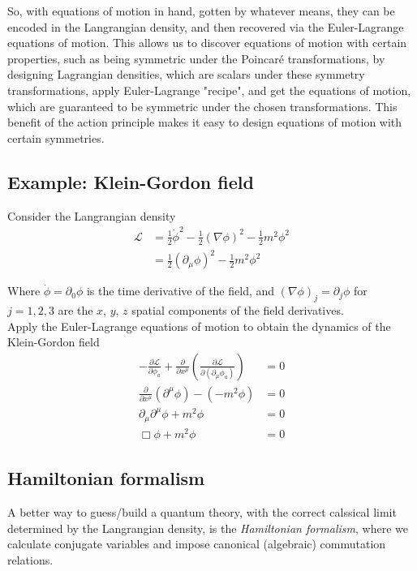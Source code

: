\noindent So, with equations of motion in hand, gotten by whatever means, they can be encoded in the Langrangian density, and then recovered via the Euler-Lagrange equations of motion. This allows us to discover equations of motion with certain properties, such as being symmetric under the Poincar\'e transformations, by designing Lagrangian densities, which are scalars under these symmetry transformations, apply Euler-Lagrange "recipe", and get the equations of motion, which are guaranteed to be symmetric under the chosen transformations. This benefit of the action principle makes it easy to design equations of motion with certain symmetries. \\

\subsection*{Example: Klein-Gordon field}

Consider the Langrangian density 
\begin{align}
\mathscr{L} &= \frac{1}{2}\dot{\phi}^2 - \frac{1}{2}(\nabla\phi)^2 - \frac{1}{2}m^2\phi^2 \\
&= \frac{1}{2}(\partial_\mu \phi)^2 - \frac{1}{2}m^2\phi^2
\end{align}

\noindent Where $\dot{\phi} = \partial_0 \phi$ is the time derivative of the field, and $(\nabla\phi)_j = \partial_j\phi$ for $j=1, 2, 3$ are the $x$, $y$, $z$ spatial components of the field derivatives. \\

\noindent Apply the Euler-Lagrange equations of motion to obtain the dynamics of the Klein-Gordon field
\begin{align}
-\frac{\partial \mathscr{L}}{\partial \phi_a} + \frac{\partial}{\partial x^\mu} \left( \frac{\partial \mathscr{L}}{\partial (\partial_\mu \phi_a)} \right) &= 0 \\
\frac{\partial}{\partial x^\mu}(\partial^\mu \phi) -(-m^2 \phi) &= 0 \\
\partial_\mu \partial^\mu \phi + m^2 \phi &=0 \\
\Box \phi + m^2 \phi &= 0
\end{align}

\subsection*{Hamiltonian formalism}

\noindent A better way to guess/build a quantum theory, with the correct calssical limit determined by the Langrangian density, is the \textit{Hamiltonian formalism}, where we calculate conjugate variables and impose canonical (algebraic) commutation relations. \\

